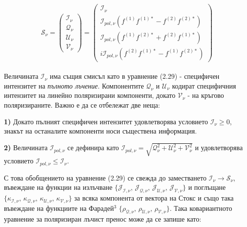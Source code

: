 \begin{equation}
	\mathcal{S}_\nu = \begin{pmatrix}
					\mathcal{I}_\nu \\
					\mathcal{Q}_\nu \\
					\mathcal{U}_\nu \\
					\mathcal{V}_\nu
				\end{pmatrix} = 
				\begin{pmatrix}
					\mathcal{I}_\nu \\
					\mathcal{I}_{pol, \nu} \left(f^{(1)} f^{(1)*} - f^{(2)} f^{(2)*} \right) \\
					\mathcal{I}_{pol, \nu} \left(f^{(1)} f^{(2)*} + f^{(2)} f^{(1)*} \right) \\
					i\mathcal{I}_{pol, \nu} \left(f^{(2)} f^{(1)*} - f^{(1)} f^{(2)*} \right)	
				\end{pmatrix} 
\end{equation}\\

\noindent Величината $\mathcal{I}_\nu$ има същия смисъл като в уравнение (2.29) - специфичен интензитет на \emph{пълното лъчение}. Компонентите $\mathcal{Q}_\nu$ и $\mathcal{U}_\nu$ кодират специфичния интензитет на линейно поляризирани компоненти, докато $\mathcal{V}_\nu$ - на кръгово поляризираните. Важно е да се отбележат две неща:\\\newline

\noindent\textbf{1)} Докато пълният специфичен интензитет удовлетворява условието $\mathcal{I}_\nu \ge 0$, знакът на останалите компоненти носи съществена информация.\\\newline

\noindent\textbf{2)} Величината $\mathcal{I}_{pol, \nu}$ се дефинира като $\mathcal{I}_{pol, \nu} = \sqrt{\mathcal{Q}_\nu^2 + \mathcal{U}_\nu^2 + \mathcal{V}_\nu^2}$ и удовлетворява условието $\mathcal{I}_{pol,\nu}\le\mathcal{I}_\nu$.\\\newline

\noindent С това обобщението на уравнение (2.29) се свежда до заместването $\mathcal{I}_\nu \rightarrow \mathcal{S}_\nu$, въвеждане на функции на излъчване $\{\mathcal{J}_\mathcal{I,\nu}, \,\mathcal{J}_\mathcal{Q,\nu},\, \mathcal{J}_\mathcal{U,\nu},\, \mathcal{J}_\mathcal{V,\nu}\}$ и поглъщане $\{\kappa_\mathcal{I,\nu}, \,\kappa_\mathcal{Q,\nu},\, \kappa_\mathcal{U,\nu},\, \kappa_\mathcal{V,\nu}\}$ за всяка компонента от вектора на Стокс и също така въвеждане на функциите на Фарадей$^3$ $\{\rho_\mathcal{Q,\nu},\, \rho_\mathcal{U,\nu},\, \rho_\mathcal{V,\nu}\}$. Така ковариантното уравнение за поляризиран лъчист пренос може да се запише като:

